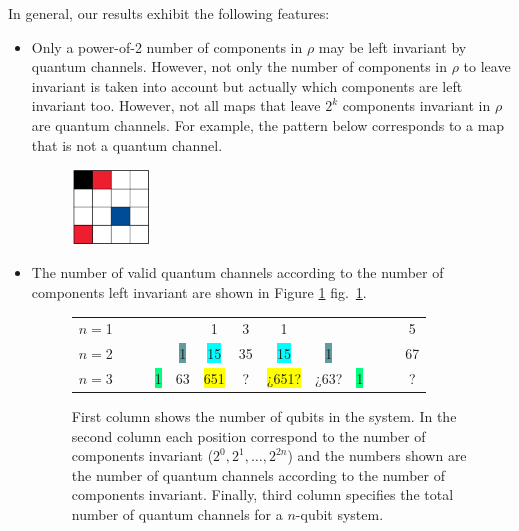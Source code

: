 \documentclass[11pt,dvipsnames]{article} %
\newcommand{\fref}[1]{fig.~\ref{#1}}  \newcommand{\tref}[1]{table~\ref{#1}}
\newcommand{\1}{\mathds{1}}
\begin{document}
In general, our results exhibit the following features:
\begin{itemize}
\item Only a power-of-2 number of components in $\rho$ 
may be left invariant by quantum
channels. However, not only the number of components in $\rho$ 
to leave invariant is taken into account but actually 
which components are left invariant too.
However, not all maps that leave $2^{k}$ components invariant in $\rho$
are quantum channels. For example, the pattern below corresponds 
to a map that is not a quantum channel. 
\begin{figure}[H]
	\centering
	\includegraphics[height=2cm]{img/not-cc}
\end{figure}

\item 
The number of valid quantum channels according to the number of components
left invariant are shown in Figure \ref{fig:CCs-by-components} \fref{fig:CCs-by-components}. 

\begin{figure}[H]%
	\centering
	\begin{tabular}{>{$n=$}l<{\hfill}*{12}{c}}
1 &&&&&\colorbox{Apricot}{1}&3&\colorbox{Apricot}{1}&&&&&5\\
2 &&&&\colorbox{CadetBlue}{1}&\colorbox{Cyan}{15}&35&\colorbox{Cyan}{15}&\colorbox{CadetBlue}{1}&&&&67\\
3 &&&\colorbox{SpringGreen}{1}&\colorbox{RedOrange}{63}&\colorbox{Yellow}{651}&?&\colorbox{Yellow}{¿651?}&
\colorbox{RedOrange}{¿63?}&\colorbox{SpringGreen}{1}&&&?
\end{tabular}
\caption{First column shows the number of qubits in the system.  In the second
column each position correspond to the number of components invariant ($2^0,
2^1, \ldots, 2^{2n}$) and the numbers shown are the number of quantum channels
according to the number of components invariant.  Finally, third column
specifies the total number of quantum channels for a $n$-qubit system.}
\label{fig:CCs-by-components}
\end{figure} %


\end{itemize}
\end{document}
